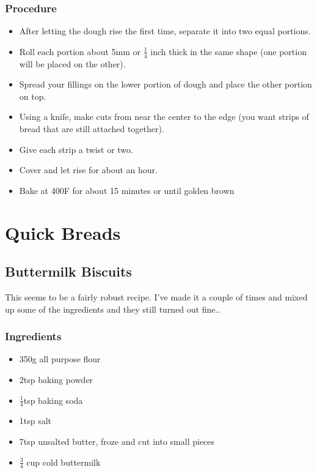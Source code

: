 \documentclass[10pt, openany]{book}
\begin{document}
\subsection{Procedure}
\begin{itemize}
  \item After letting the dough rise the first time, separate it into two equal portions.
  \item Roll each portion about 5mm or $\frac{1}{4}$ inch thick in the same shape (one portion will be placed on the other).
  \item Spread your fillings on the lower portion of dough and place the other portion on top.
  \item Using a knife, make cuts from near the center to the edge (you want strips of bread that are still attached together).
  \item Give each strip a twist or two.
  \item Cover and let rise for about an hour.
  \item Bake at 400\degree{}F for about 15 minutes or until golden brown
\end{itemize}
\chapter{Quick Breads}
\section{Buttermilk Biscuits}
This seems to be a fairly robust recipe.  I've made it a couple of times and mixed up some of the ingredients and they still turned out fine..
\subsection{Ingredients}
\begin{itemize}
  \item 350g all purpose flour
  \item 2tsp baking powder
  \item $\frac{1}{4}$tsp baking soda
  \item 1tsp salt
  \item 7tsp unsalted butter, froze and cut into small pieces
  \item $\frac{3}{4}$ cup cold buttermilk
\end{itemize}
\end{document}
